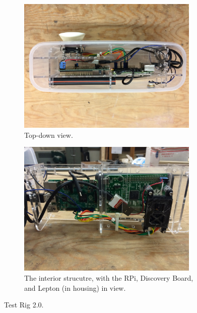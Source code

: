 \begin{figure}
\centering
\begin{subfigure}{0.4\textwidth}
 \centering
 \includegraphics[width=0.95\textwidth, angle= 180]{"./image/testrig2_top"}
 \caption{Top-down view.}
 \label{fig:testrig2_testing:sub1}
\end{subfigure}
\begin{subfigure}{0.4\textwidth}
 \centering
 \includegraphics[width=0.95\textwidth, angle= 180]{"./image/testrig2_interior"}
 \caption{The interior strucutre, with the RPi, Discovery Board, and Lepton (in housing) in view.}
 \label{fig:testrig2_testing:sub2}
\end{subfigure}
\caption{Test Rig 2.0.}
\label{fig:testrig2_testing}
\end{figure}

